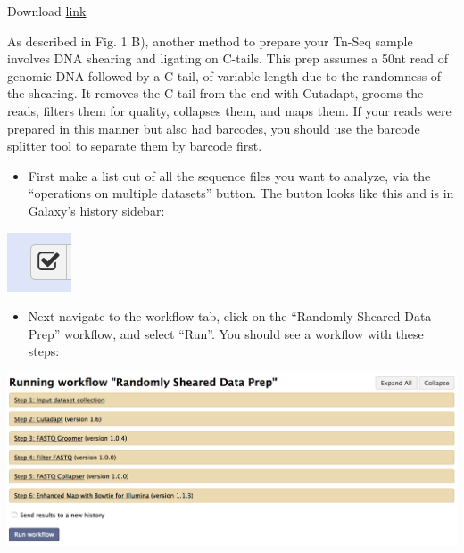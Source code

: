 \documentclass{article}
\begin{document}
Download \href{https://github.com/vanOpijnenLab/magenta-p2/blob/master/workflows/Randomly%20Sheared%20Data%20Prep.ga}{link}

\vspace{5 mm}

\noindent
As described in Fig. 1 B), another method to prepare your Tn-Seq sample involves DNA shearing and ligating on C-tails. This prep assumes a 50nt read of genomic DNA followed by a C-tail, of variable length due to the randomness of the shearing. It removes the C-tail from the end with Cutadapt, grooms the reads, filters them for quality, collapses them, and maps them. If your reads were prepared in this manner but also had barcodes, you should use the barcode splitter tool to separate them by barcode first.

\vspace{5 mm}

\begin{itemize}

\item First make a list out of all the sequence files you want to analyze, via the “operations on multiple datasets” button. The button looks like this and is in Galaxy's history sidebar:

\end{itemize}

\includegraphics[scale=1.0]{opbutton.png}

\begin{itemize}

\item Next navigate to the workflow tab, click on the “Randomly Sheared Data Prep” workflow, and select “Run”. You should see a workflow with these steps:

\end{itemize}

\vspace{5 mm}

\noindent
\includegraphics[scale=0.5]{Random.png}
\end{document}
